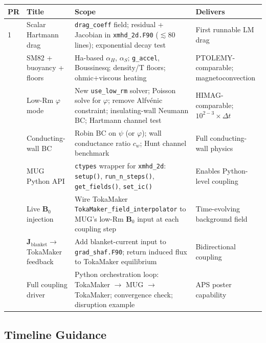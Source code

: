 \documentclass[11pt,letterpaper]{article}
\begin{document}
\begin{center}
\begin{longtable}{p{}p{}p{}p{}}
\toprule
\textbf{PR} & \textbf{Title} & \textbf{Scope} & \textbf{Delivers} \\
\midrule
1 & Scalar Hartmann drag & \texttt{drag\_coeff} field; residual + Jacobian in \texttt{xmhd\_2d.F90} ($\lesssim$80 lines); exponential decay test & First runnable LM drag \\
\addlinespace
2 & SM82 + buoyancy + floors & Ha-based $\alpha_H$, $\alpha_S$; \texttt{g\_accel}, Boussinesq; density/T floors; ohmic+viscous heating & PTOLEMY-comparable; magnetoconvection \\
\addlinespace
3 & Low-Rm $\varphi$ mode & New \texttt{use\_low\_rm} solver; Poisson solve for $\varphi$; remove Alfvénic constraint; insulating-wall Neumann BC; Hartmann channel test & HIMAG-comparable; $10^{2-3}\times \Delta t$ \\
\addlinespace
4 & Conducting-wall BC & Robin BC on $\psi$ (or $\varphi$); wall conductance ratio $c_w$; Hunt channel benchmark & Full conducting-wall physics \\
\addlinespace
5 & MUG Python API & \texttt{ctypes} wrapper for \texttt{xmhd\_2d}: \texttt{setup()}, \texttt{run\_n\_steps()}, \texttt{get\_fields()}, \texttt{set\_ic()} & Enables Python-level coupling \\
\addlinespace
6 & Live $\mathbf{B}_0$ injection & Wire TokaMaker \texttt{TokaMaker\_field\_interpolator} to MUG's low-Rm $\mathbf{B}_0$ input at each coupling step & Time-evolving background field \\
\addlinespace
7 & $\mathbf{J}_{\mathrm{blanket}} \to$ TokaMaker feedback & Add blanket-current input to \texttt{grad\_shaf.F90}; return induced flux to TokaMaker equilibrium & Bidirectional coupling \\
\addlinespace
8 & Full coupling driver & Python orchestration loop: TokaMaker $\to$ MUG $\to$ TokaMaker; convergence check; disruption example & APS poster capability \\
\bottomrule
\end{longtable}
\end{center}

\subsection{Timeline Guidance}
\end{document}

